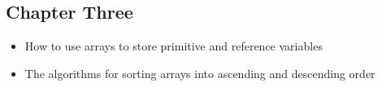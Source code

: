 \documentclass[11pt]{article}
\begin{document}
\vspace*{-.2in}
\subsection*{Chapter Three}

\begin{itemize}

  \item How to use arrays to store primitive and reference variables
  \item The algorithms for sorting arrays into ascending and descending order

\end{itemize}
\end{document}

